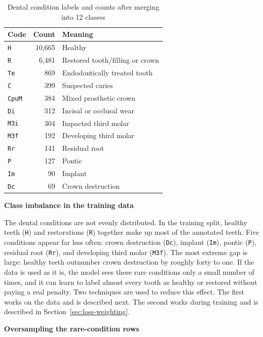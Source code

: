 \documentclass[a4paper,12pt]{report}
\newcommand{\minisection}[1]{%
  \vspace{1ex}
  \noindent\textbf{#1}\par
  \vspace{0.5ex}
}
\begin{document}
\begin{table}[H]
\centering
\caption{Dental condition labels and counts after merging into 12 classes}
\renewcommand{\arraystretch}{1}
\begin{tabular}{@{}l r p{7cm}@{}}
\toprule
\textbf{Code} & \textbf{Count} & \textbf{Meaning} \\
\midrule
\texttt{H}    & 10,665 & Healthy \\
\texttt{R}    & 6,481  & Restored tooth/filling or crown \\
\texttt{Te}   & 869    & Endodontically treated tooth \\
\texttt{C}    & 399    & Suspected caries \\
\texttt{CpuM} & 384    & Mixed prosthetic crown \\
\texttt{Di}   & 312    & Incisal or occlusal wear \\
\texttt{M3i}  & 304    & Impacted third molar \\
\texttt{M3f}  & 192    & Developing third molar \\
\texttt{Rr}   & 141    & Residual root \\
\texttt{P}    & 127    & Pontic \\
\texttt{Im}   & 90     & Implant \\
\texttt{Dc}   & 69     & Crown destruction \\
\bottomrule
\end{tabular}
\end{table}




\minisection{Class imbalance in the training data}

The dental conditions are not evenly distributed. In the training split, healthy teeth (\texttt{H}) and restorations (\texttt{R}) together make up most of the annotated teeth. Five conditions appear far less often: crown destruction (\texttt{Dc}), implant (\texttt{Im}), pontic (\texttt{P}), residual root (\texttt{Rr}), and developing third molar (\texttt{M3f}). The most extreme gap is large: healthy teeth outnumber crown destruction by roughly forty to one. If the data is used as it is, the model sees these rare conditions only a small number of times, and it can learn to label almost every tooth as healthy or restored without paying a real penalty. Two techniques are used to reduce this effect. The first works on the data and is described next. The second works during training and is described in Section~\ref{sec:loss-weighting}.

\minisection{Oversampling the rare-condition rows}
\end{document}
